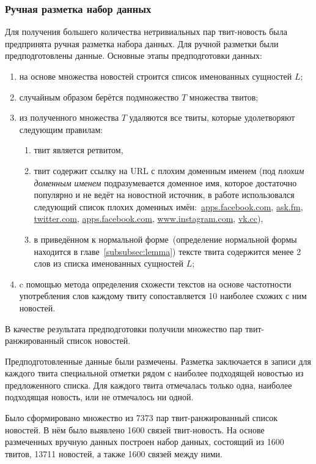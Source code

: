     \subsubsection{Ручная разметка набор данных}
        Для получения большего количества нетривиальных пар твит-новость была предпринята ручная разметка набора данных.
        Для ручной разметки были предподготовлены данные. Основные этапы предподготовки данных:
        \begin{enumerate}
            \item на основе множества новостей строится список именованных сущностей $L$;
            \item случайным образом берётся подмножество $T$ множества твитов;
            \item из полученного множества $T$ удаляются все твиты, которые удолетворяют следующим правилам:
            \begin{enumerate}
                \item твит является ретвитом,
                \item твит содержит ссылку на URL с плохим доменным именем (под \textit{плохим доменным именем} подразумевается доменное имя,
                которое достаточно популярно и не ведёт на новостной источник, в работе использовался следующий список плохих доменных имён:\
                \url{apps.facebook.com}, \url{ask.fm}, \url{twitter.com}, \url{apps.facebook.com}, \url{www.instagram.com}, \url{vk.cc}),
                \item в приведённом к нормальной форме~(определение нормальной формы находится в главе~\ref{subsubsec:lemma}) тексте твита содержится менее 2 слов из списка именованных сущностей $L$;
            \end{enumerate}
            \item c помощью метода определения схожести текстов на основе частотности употребления слов каждому твиту сопоставляется 10 наиболее схожих с ним новостей.
        \end{enumerate}
        В качестве результата предподготовки получили множество пар твит-ранжированный список новостей.

        Предподготовленные данные были размечены.
        Разметка заключается в записи для каждого твита специальной отметки рядом с наиболее подходящей новостью из предложенного списка.
        Для каждого твита отмечалась только одна, наиболее подходящая новость, или не отмечалось ни одной.

        Было сформировано множество из 7373 пар твит-ранжированный список новостей. В нём было выявлено 1600 связей твит-новость.
        На основе размеченных вручную данных построен набор данных, состоящий из 1600 твитов, 13711 новостей, а также 1600 связей между ними.

